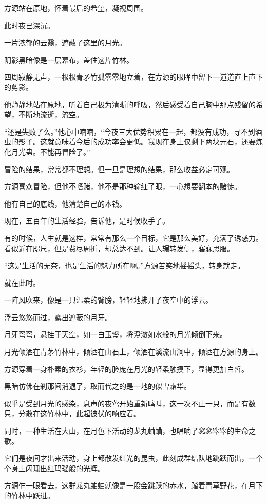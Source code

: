 \begin{this_body}
方源站在原地，怀着最后的希望，凝视周围。

此时夜已深沉。

一片浓郁的云翳，遮蔽了这里的月光。

阴影黑暗像是一层幕布，盖住这片竹林。

四周寂静无声，一根根青矛竹孤零零地立着，在方源的眼眸中留下一道道直上直下的剪影。

他静静地站在原地，听着自己极为清晰的呼吸，然后感受着自己胸中那点残留的希望，不断地流逝，流空。

“还是失败了么。”他心中喃喃，“今夜三大优势积累在一起，都没有成功，寻不到酒虫的影子。这就意味着今后的成功率会更低。我现在身上仅剩下两块元石，还要炼化月光蛊。不能再冒险了。”

冒险的结果，常常都不理想。但一旦是理想的结果，那么收益必定可观。

方源喜欢冒险，但他不嗜赌，他不是那种输红了眼，一心想要翻本的赌徒。

他有自己的底线，他清楚自己的本钱。

现在，五百年的生活经验，告诉他，是时候收手了。

有的时候，人生就是这样，常常有那么一个目标，它是那么美好，充满了诱惑力。看似近在咫尺，但是费尽周折，却总达不到。让人辗转发侧，寤寐思服。

“这是生活的无奈，也是生活的魅力所在啊。”方源苦笑地摇摇头，转身就走。

就在此时。

一阵风吹来，像是一只温柔的臂膀，轻轻地拂开了夜空中的浮云。

浮云悠悠而过，露出遮蔽的月牙。

月牙弯弯，悬挂于天空，如一白玉盏，将澄澈如水般的月光倾倒下来。

月光倾洒在青茅竹林中，倾洒在山石上，倾洒在溪流山涧中，倾洒在方源的身上。

方源穿着一身朴素的衣衫，年轻的脸庞在月光的轻柔触摸下，显得更加白皙。

黑暗仿佛在刹那间消退了，取而代之的是一地的似雪霜华。

似乎是受到月光的感染，息声的夜莺开始重新鸣叫，这一次不止一只，而是有数只，分散在这竹林中，此起彼伏的响应着。

同时，一种生活在大山，在月色下活动的龙丸蛐蛐，也唱响了窸窸窣窣的生命之歌。

它们是夜间才出来活动，身上都散发红光的昆虫，此刻成群结队地跳跃而出，一个个身上闪现出红玛瑙般的光辉。

方源乍一眼看去，这群龙丸蛐蛐就像是一股会跳跃的赤水，踏着青草野花，在月下的竹林中跃进。


\end{this_body}
